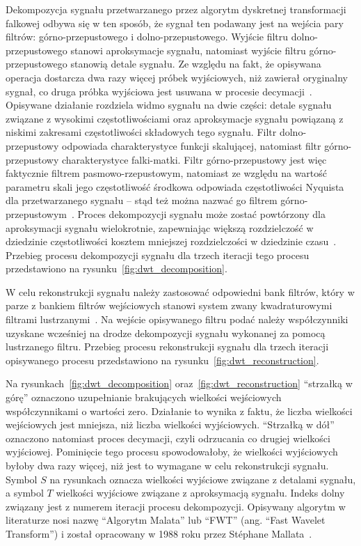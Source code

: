 Dekompozycja sygnału przetwarzanego przez algorytm dyskretnej transformacji falkowej odbywa się w ten sposób, że sygnał ten podawany jest na wejścia pary filtrów: górno-przepustowego i dolno-przepustowego. Wyjście filtru dolno-przepustowego stanowi aproksymacje sygnału, natomiast wyjście filtru górno-przepustowego stanowią detale sygnału. Ze względu na fakt, że opisywana operacja dostarcza dwa razy więcej próbek wyjściowych, niż zawierał oryginalny sygnał, co druga próbka wyjściowa jest usuwana w procesie decymacji~\cite{lord_guide}. Opisywane działanie rozdziela widmo sygnału na dwie części: detale sygnału związane z wysokimi częstotliwościami oraz aproksymacje sygnału powiązaną z niskimi zakresami częstotliwości składowych tego sygnału. Filtr dolno-przepustowy odpowiada charakterystyce funkcji skalującej, natomiast filtr górno-przepustowy charakterystyce falki-matki. Filtr górno-przepustowy jest więc faktycznie filtrem pasmowo-rzepustowym, natomiast ze względu na wartość parametru skali jego częstotliwość środkowa odpowiada częstotliwości Nyquista dla przetwarzanego sygnału -- stąd też można nazwać go filtrem górno-przepustowym~\cite{ahmad_wavelet}. Proces dekompozycji sygnału może zostać powtórzony dla aproksymacji sygnału wielokrotnie, zapewniając większą rozdzielczość w dziedzinie częstotliwości kosztem mniejszej rozdzielczości w dziedzinie czasu~\cite{vonesch_dbbasics}. Przebieg procesu dekompozycji sygnału dla trzech iteracji tego procesu przedstawiono na rysunku~\ref{fig:dwt_decomposition}.

W celu rekonstrukcji sygnału należy zastosować odpowiedni bank filtrów, który w parze z bankiem filtrów wejściowych stanowi system zwany kwadraturowymi filtrami lustrzanymi~\cite{johnston_filter}. Na wejście opisywanego filtru podać należy współczynniki uzyskane wcześniej na drodze dekompozycji sygnału wykonanej za pomocą lustrzanego filtru. Przebieg procesu rekonstrukcji sygnału dla trzech iteracji opisywanego procesu przedstawiono na rysunku~\ref{fig:dwt_reconstruction}.

Na rysunkach~\ref{fig:dwt_decomposition} oraz~\ref{fig:dwt_reconstruction} \enquote{strzałką w górę} oznaczono uzupełnianie brakujących wielkości wejściowych współczynnikami o wartości zero. Działanie to wynika z faktu, że liczba wielkości wejściowych jest mniejsza, niż liczba wielkości wyjściowych. \enquote{Strzałką w dół} oznaczono natomiast proces decymacji, czyli odrzucania co drugiej wielkości wyjściowej. Pominięcie tego procesu spowodowałoby, że wielkości wyjściowych byłoby dwa razy więcej, niż jest to wymagane w celu rekonstrukcji sygnału. Symbol $S$ na rysunkach oznacza wielkości wyjściowe związane z detalami sygnału, a symbol $T$ wielkości wyjściowe związane z aproksymacją sygnału. Indeks dolny związany jest z numerem iteracji procesu dekompozycji. Opisywany algorytm w literaturze nosi nazwę \enquote{Algorytm Malata} lub \enquote{FWT} (ang. \enquote{Fast Wavelet Transform}) i został opracowany w 1988 roku przez Stéphane Mallata~\cite{lujian_mallat}.


